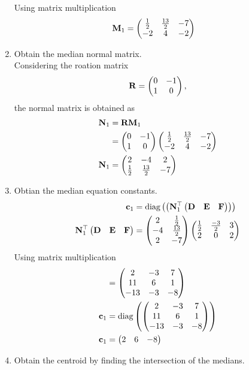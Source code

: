 \documentclass[11pt]{book}
\begin{document}
\begin{enumerate}[label=\thesubsection.\arabic*.,ref=\thesubsection.\theenumi]
  Using matrix multiplication 
  \begin{align}
   \mathbf{M}_1 &=   \begin{pmatrix}\frac{1}{2} & \frac{13}{2} & -7 \\ -2 & 4 & -2\end{pmatrix}
  \end{align}
\item Obtain the median normal matrix. \\
\solution Considering the roation matrix
\begin{align}
\mathbf{R}  = \begin{pmatrix}0 & -1 \\ 1 & 0\end{pmatrix},
\end{align}
the normal matrix is obtained as
\begin{align}
\mathbf{N}_1 &= \mathbf{R}\mathbf{M}_1  \\
&=\begin{pmatrix}0 & -1 \\ 1 & 0\end{pmatrix} \begin{pmatrix}\frac{1}{2} & \frac{13}{2} & -7 \\ -2 & 4 & -2\end{pmatrix} \\
\mathbf{N}_1 &=  \begin{pmatrix} 2 & -4 & 2 \\ \frac{1}{2} & \frac{13}{2} & -7 \end{pmatrix}
\end{align}
\item Obtian the median equation constants. \\
\begin{align}
\mathbf{c}_1 &= \text{diag}\left(\left(\mathbf{N}_1^{\top}\begin{pmatrix}\mathbf{D} & \mathbf{E} & \mathbf{F} \end{pmatrix}\right)\right)  \\
\mathbf{N}_1^{\top}\begin{pmatrix}\mathbf{D} & \mathbf{E} & \mathbf{F} \end{pmatrix} &= \begin{pmatrix}2&\frac{1}{2} \\ -4&\frac{13}{2} \\ 2 &-7\end{pmatrix}\begin{pmatrix}\frac{1}{2} & \frac{-3}{2} & 3 \\ 2 & 0 & 2\end{pmatrix} \\
\end{align}
Using matrix multiplication
\begin{align}
    &=\begin{pmatrix} 2 & -3 & 7 \\ 11 & 6 & 1 \\ -13 & -3 & -8 \end{pmatrix} \\
    \mathbf{c}_1 &= \text{diag}\left(\begin{pmatrix} 2 & -3 & 7 \\ 11 & 6 & 1 \\ -13 & -3 & -8 \end{pmatrix}\right) \\
    \mathbf{c}_1 &= \begin{pmatrix} 2 & 6 & -8\end{pmatrix}
\end{align}
\item Obtain the centroid by finding the intersection of the medians.\\
\solution
 \begin{align}

\end{align}
\end{enumerate}
\end{document}
